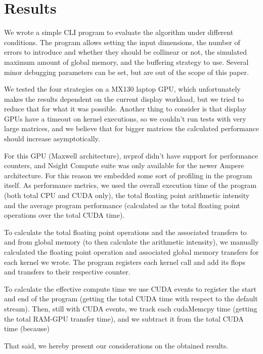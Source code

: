 \section{Results}
\label{sec:results}

We wrote a simple CLI program to evaluate the algorithm under different conditions.
The program allows setting the input dimensions, the number of errors to introduce
and whether they should be collinear or not,
the simulated maximum amount of global memory, and the buffering strategy to use.
Several minor debugging parameters can be set, but are out of the scope of this paper.

We tested the four strategies on a MX130 laptop GPU, which unfortunately makes the results dependent on the current display workload, but we tried to reduce that for what it was possible.
Another thing to consider is that display GPUs have a timeout on kernel executions, so we couldn't run tests with very large matrices, and we believe that for bigger matrices the calculated performance should increase asymptotically.

For this GPU (Maxwell architecture), nvprof didn't have support for performance counters, and Nsight Compute suite was only available for the newer Ampere architecture.
For this reason we embedded some sort of profiling in the program itself.
As performance metrics, we used the overall execution time of the program (both total CPU and CUDA only), the total floating point arithmetic intensity and the average program performance (calculated as the total floating point operations over the total CUDA time).

To calculate the total floating point operations and the associated transfers to and from global memory (to then calculate the arithmetic intensity), we manually calculated the floating point operation and associated global memory transfers for each kernel we wrote. The program registers each kernel call and add its flops and transfers to their respective counter.

To calculate the effective compute time we use CUDA events to register the start and end of the program (getting the total CUDA time with respect to the default stream).
Then, still with CUDA events, we track each cudaMemcpy time (getting the total RAM-GPU transfer time), and we subtract it from the total CUDA time (because)

That said, we hereby present our considerations on the obtained results.
